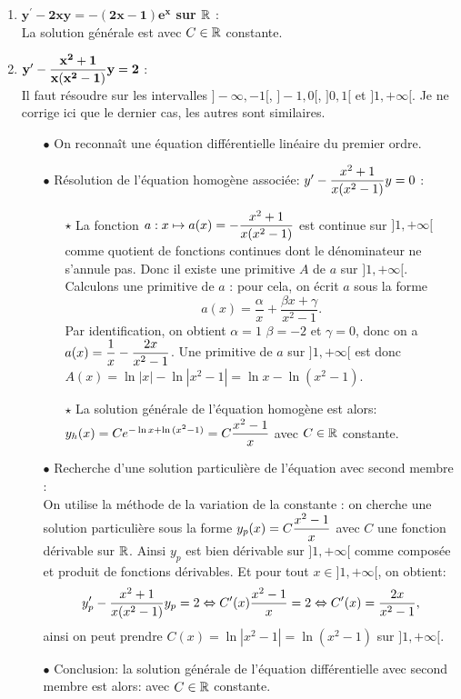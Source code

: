 \documentclass[a4paper, 11pt,reqno]{article}
\begin{document}
\begin{correction}
\begin{enumerate}
La solution g\'en\'erale est  avec $C\in\R$ constante.
\item \textbf{$\mathbf{y^{\prime}-2xy=-(2x-1)e^x}$ sur $\mathbb{R}$} :\\
La solution g\'en\'erale est  avec $C\in\R$ constante.
\item \textbf{$\mathbf{y^{\prime}-\displaystyle\frac{x^2+1}{x(x^2-1)}y=2}$} :\\
Il faut r\'esoudre sur les intervalles $]-\infty,-1[$, $]-1,0[$, $]0,1[$ et $]1, +\infty[$. Je ne corrige ici que le dernier cas, les autres sont similaires.
\begin{itemize}
\item[$\bullet$] On reconna\^{i}t une \'equation diff\'erentielle lin\'eaire du premier ordre. 
\item[$\bullet$] R\'esolution de l'\'equation homog\`{e}ne associ\'ee: $y^{\prime}-\displaystyle\frac{x^2+1}{x(x^2-1)}y=0$ :\\
\begin{itemize}
\item[$\star$] La fonction $a: x\mapsto a(x)=\displaystyle -\frac{x^2+1}{x(x^2-1)}$ est continue sur $]1,+\infty[$ comme quotient de fonctions continues dont le d\'enominateur ne s'annule pas. Donc il existe une primitive $A$ de $a$ sur $]1,+\infty[$. Calculons une primitive de $a$ : pour cela, on \'ecrit $a$ sous la forme 
$$a(x) = \frac{\alpha}{x} + \frac{\beta x + \gamma}{x^2-1}.$$
Par identification, on obtient $\alpha = 1$ $\beta = -2$ et $\gamma=0$, donc on a $a(x) = \displaystyle \frac{1}{x} - \frac{2x}{x^2-1}$. Une primitive de $a$ sur $]1,+\infty[$ est donc $A(x) = \ln |x| - \ln |x^2-1| = \ln x - \ln (x^2-1)$. 
\item[$\star$] La solution g\'en\'erale de l'\'equation homog\`{e}ne est alors: $y_h(x)= Ce^{-\ln x+ \ln{(x^2-1)}}=\displaystyle C \frac{x^2-1}{x}$ avec $C\in\R$ constante.
\end{itemize}
\item[$\bullet$] Recherche d'une solution particuli\`{e}re de l'\'equation avec second membre :\\
\noindent On utilise la m\'ethode de la variation de la constante : on cherche une solution particuli\`ere sous la forme $y_p(x)= \displaystyle C \frac{x^2-1}{x}$ avec $C$ une fonction d\'erivable sur $\mathbb{R}$. Ainsi $y_p$ est bien d\'erivable sur $]1,+\infty[$ comme compos\'ee et produit de fonctions d\'erivables. Et pour tout $x\in ]1,+\infty[$, on obtient:
$$y_p^{\prime}-\displaystyle\frac{x^2+1}{x(x^2-1)}y_p=2 \Leftrightarrow C'(x) \frac{x^2-1}{x} = 2 \Leftrightarrow C'(x) = \frac{2x}{x^2-1},$$
ainsi on peut prendre $C(x) = \ln |x^2-1| = \ln (x^2-1)$ sur $]1,+\infty[$.
\item[$\bullet$] Conclusion: la solution g\'en\'erale de l'\'equation diff\'erentielle avec second membre est alors:  avec $C\in\R$ constante.
\end{itemize}


\end{enumerate}
\end{correction}
\end{document}

